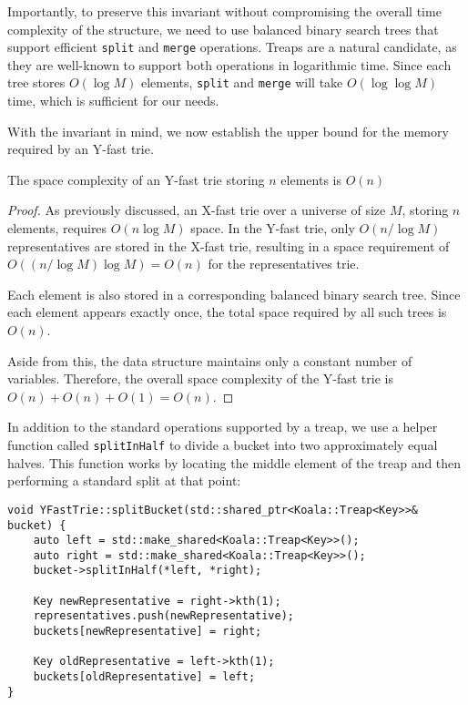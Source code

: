 Importantly, to preserve this invariant without compromising the overall time complexity of the structure, we need to use balanced binary search trees that support efficient \texttt{split} and \texttt{merge} operations. Treaps are a natural candidate, as they are well-known to support both operations in logarithmic time. Since each tree stores \( O(\log M) \) elements, \texttt{split} and \texttt{merge} will take \( O(\log \log M) \) time, which is sufficient for our needs.

With the invariant in mind, we now establish the upper bound for the memory required by an Y-fast trie.

\begin{lemma}
The space complexity of an Y-fast trie storing \( n\) elements is \( O(n) \)
\end{lemma}

\begin{proof}
As previously discussed, an X-fast trie over a universe of size \( M \), storing \( n \) elements, requires \( O(n \log M) \) space. In the Y-fast trie, only \( O(n / \log M) \) representatives are stored in the X-fast trie, resulting in a space requirement of \( O((n / \log M) \log M) = O(n) \) for the representatives trie.

Each element is also stored in a corresponding balanced binary search tree. Since each element appears exactly once, the total space required by all such trees is \( O(n) \).

Aside from this, the data structure maintains only a constant number of variables. Therefore, the overall space complexity of the Y-fast trie is \( O(n) + O(n) + O(1) = O(n) \).
\end{proof}

In addition to the standard operations supported by a treap, we use a helper function called \texttt{splitInHalf} to divide a bucket into two approximately equal halves. This function works by locating the middle element of the treap and then performing a standard split at that point:

\begin{verbatim}
void YFastTrie::splitBucket(std::shared_ptr<Koala::Treap<Key>>& bucket) {
    auto left = std::make_shared<Koala::Treap<Key>>();
    auto right = std::make_shared<Koala::Treap<Key>>();
    bucket->splitInHalf(*left, *right);

    Key newRepresentative = right->kth(1);
    representatives.push(newRepresentative);
    buckets[newRepresentative] = right;

    Key oldRepresentative = left->kth(1);
    buckets[oldRepresentative] = left;
}
\end{verbatim}


